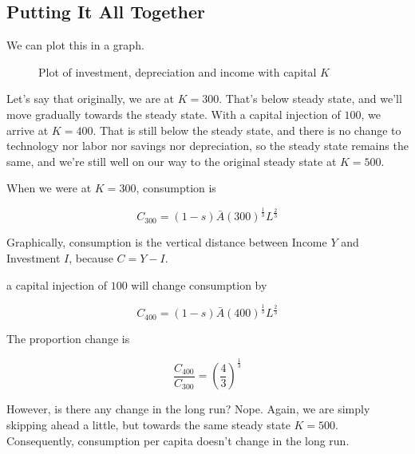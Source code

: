 \documentclass[11pt]{scrartcl}
\newcommand{\oneth}{\ensuremath{\frac{1}{3}}}
\newcommand{\twoth}{\ensuremath{\frac{2}{3}}}
\begin{document}
\subsection{Putting It All Together}

We can plot this in a graph.

\begin{figure}[ht!]
\centering
{}
\caption{Plot of investment, depreciation and income with capital $K$}
\end{figure}

Let's say that originally, we are at $K = 300$. That's below steady state, and we'll move gradually towards the steady state. With a capital injection of $100$, we arrive at $K = 400$. That is still below the steady state, and there is no change to technology nor labor nor savings nor depreciation, so the steady state remains the same, and we're still well on our way to the original steady state at $K=500$. 

When we were at $K=300$, consumption is

\[C_{300} = (1-s)\bar{A}(300)^{\oneth}L^\twoth\]

Graphically, consumption is the vertical distance between Income $Y$ and Investment $I$, because $C = Y-I$. 

a capital injection of $100$ will change consumption by

\[C_{400} = (1-s)\bar{A}(400)^{\oneth}L^\twoth\]

The proportion change is

\[\frac{C_{400}}{C_{300}} = \left(\frac{4}{3}\right)^\oneth\]

However, is there any change in the long run? Nope. Again, we are simply skipping ahead a little, but towards the same steady state $K=500$. Consequently, consumption per capita doesn't change in the long run.
\end{document}
